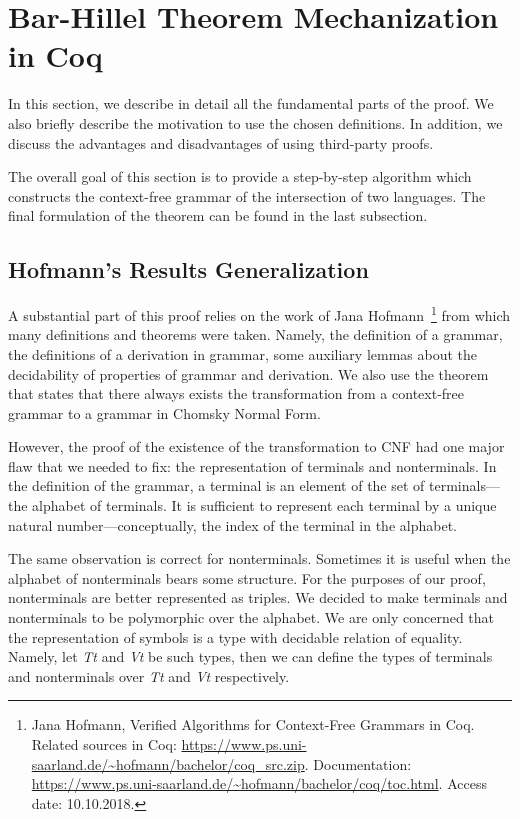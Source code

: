 \documentclass[runningheads]{llncs}
\begin{document}
\section{Bar-Hillel Theorem Mechanization in Coq}
\label{sec:main}

In this section, we describe in detail all the fundamental parts of the proof.
We also briefly describe the motivation to use the chosen definitions.
In addition, we discuss the advantages and disadvantages of using third-party proofs.

The overall goal of this section is to provide a step-by-step algorithm which constructs the context-free grammar of the intersection of two languages.
The final formulation of the theorem can be found in the last subsection.

\subsection{ Hofmann's Results Generalization}
\label{sec:solka-generalized}

A substantial part of this proof relies on the work of Jana Hofmann~\cite{smolkaHofmann2016}\footnote{Jana Hofmann, Verified Algorithms for Context-Free Grammars in Coq. Related sources in Coq: \url{https://www.ps.uni-saarland.de/~hofmann/bachelor/coq_src.zip}. Documentation: \url{https://www.ps.uni-saarland.de/~hofmann/bachelor/coq/toc.html}. Access date: 10.10.2018.} from which many definitions and theorems were taken. Namely, the definition of a grammar, the definitions of a derivation in grammar, some auxiliary lemmas about the decidability of properties of grammar and derivation. We also use the theorem that states that there always exists the transformation from a context-free grammar to a grammar in Chomsky Normal Form.

However, the proof of the existence of the transformation to CNF had one major flaw that we needed to fix: the representation of terminals and nonterminals.
In the definition of the grammar, a terminal is an element of the set of terminals---the alphabet of terminals.
It is sufficient to represent each terminal by a unique natural number---conceptually, the index of the terminal in the alphabet.

The same observation is correct for nonterminals.
Sometimes it is useful when the alphabet of nonterminals bears some structure.
For the purposes of our proof, nonterminals are better represented as triples.
We decided to make terminals and nonterminals to be polymorphic over the alphabet.
We are only concerned that the representation of symbols is a type with decidable relation of equality.
Namely, let \textit{Tt} and \textit{Vt} be such types, then we can define the types of terminals and nonterminals over \textit{Tt} and \textit{Vt} respectively.
\end{document}
